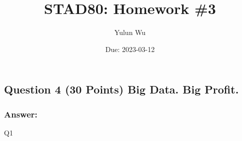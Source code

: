 \documentclass[
]{article}
\title{STAD80: Homework \#3}
\author{Yulun Wu}
\date{Due: 2023-03-12}
\begin{document}
\maketitle

{
\setcounter{tocdepth}{2}
\tableofcontents
}
\hypertarget{question-4-30-points-big-data.-big-profit.}{%
\subsection{Question 4 (30 Points) Big Data. Big
Profit.}\label{question-4-30-points-big-data.-big-profit.}}

\hypertarget{answer}{%
\subsubsection{Answer:}\label{answer}}

Q1
\end{document}
